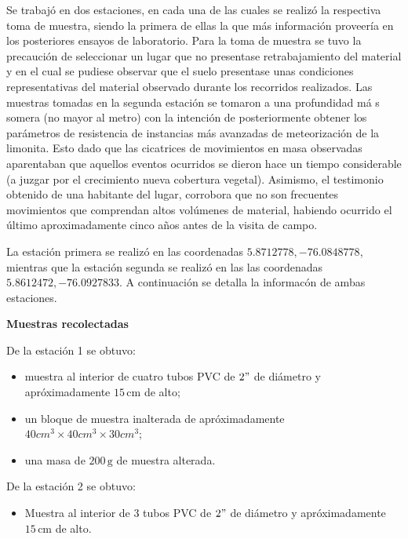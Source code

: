 Se trabaj\'o en dos estaciones, en cada una de las cuales se realiz\'o la respectiva toma de muestra, siendo la primera de ellas la que m\'as informaci\'on proveer\'ia en los posteriores ensayos de laboratorio. Para la toma de muestra se tuvo la precauci\'on de seleccionar un lugar que no presentase retrabajamiento del material y en el cual se pudiese observar que el suelo presentase unas condiciones representativas del material observado durante los recorridos realizados.
Las muestras tomadas en la segunda estaci\'on se tomaron a una profundidad m\'a s somera (no mayor al metro) con la intenci\'on de posteriormente obtener los par\'ametros de resistencia de instancias m\'as avanzadas de meteorizaci\'on de la limonita. Esto dado que las cicatrices de movimientos en masa observadas aparentaban que aquellos eventos ocurridos se dieron hace un tiempo considerable (a juzgar por el crecimiento nueva cobertura vegetal). Asimismo, el testimonio obtenido de una habitante del lugar, corrobora que no son frecuentes movimientos que comprendan altos vol\'umenes de material, habiendo ocurrido el \'ultimo aproximadamente cinco a\~nos antes de la visita de campo.

La estaci\'on primera se realiz\'o en las coordenadas \(5.8712778, -76.0848778\), mientras que la estaci\'on segunda se realiz\'o en las las coordenadas \(5.8612472,-76.0927833\).
A continuaci\'on se detalla la informac\'on de ambas estaciones.

\textbf{Muestras recolectadas}

De la estaci\'on 1 se obtuvo:
\begin{itemize}
  \item muestra al interior de cuatro tubos PVC de \(2"\) de di\'ametro y apr\'oximadamente \(15\,\text{cm}\) de alto;
  \item un bloque de muestra inalterada  de apr\'oximadamente \(40cm^3 \times 40cm^3 \times 30cm^3\);
  \item una masa de \(200\,\text{g}\) de muestra alterada.
\end{itemize}

De la estaci\'on 2 se obtuvo:
\begin{itemize}
  \item Muestra al interior de 3 tubos PVC de \(2"\) de di\'ametro y apr\'oximadamente \(15\,\text{cm}\) de alto.
\end{itemize}

